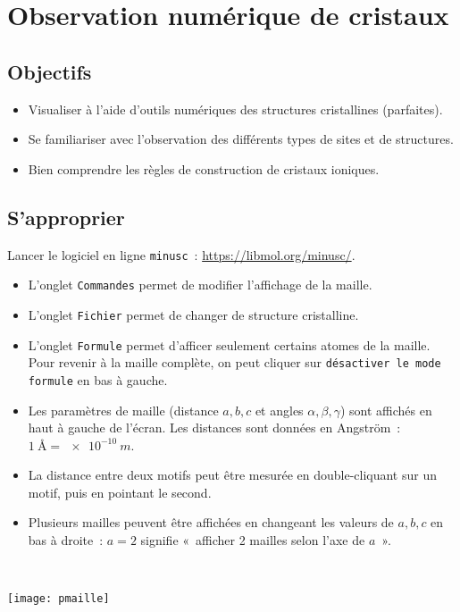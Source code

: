 \documentclass[a4paper, 10pt, final, garamond]{book}
\begin{document}
\setcounter{chapter}{28}

\chapter{Observation numérique de cristaux}
\section{Objectifs}

\begin{itemize}
  \item Visualiser à l'aide d'outils numériques des structures cristallines
    (parfaites).
  \item Se familiariser avec l'observation des différents types de sites et de
    structures.
  \item Bien comprendre les règles de construction de cristaux ioniques.
\end{itemize}

\section{S'approprier}

Lancer le logiciel en ligne \texttt{minusc}~: \url{https://libmol.org/minusc/}.
\begin{itemize}
  \item L'onglet \texttt{Commandes} permet de modifier l'affichage de la maille.
  \item L'onglet \texttt{Fichier} permet de changer de structure cristalline.
  \item L'onglet \texttt{Formule} permet d'afficer seulement certains atomes de
    la maille. Pour revenir à la maille complète, on peut cliquer sur
    \texttt{désactiver le mode formule} en bas à gauche.
\end{itemize}
\bigbreak
\noindent
\begin{minipage}[t]{.5\linewidth}
  \begin{itemize}
    \item Les paramètres de maille (distance $a,b,c$ et angles $\alpha, \beta,
      \gamma$) sont affichés en haut à gauche de l'écran. Les distances sont
      données en Angström~: $\SI{1}{\angstrom} = \SI{e-10}{m}$.
    \item La distance entre deux motifs peut être mesurée en double-cliquant sur
      un motif, puis en pointant le second.
    \item Plusieurs mailles peuvent être affichées en changeant les valeurs de
      $a,b,c$ en bas à droite~: $a=2$ signifie «~afficher 2 mailles selon l'axe
      de $a$~».
  \end{itemize}
\end{minipage}
\hfill
\noindent
\begin{minipage}[t]{.5\linewidth}
  ~
  \vspace{-20pt}
  \begin{center}
    \texttt{[image: pmaille]}
    \label{fig:pmaille}
  \end{center}
\end{minipage}
\end{document}
